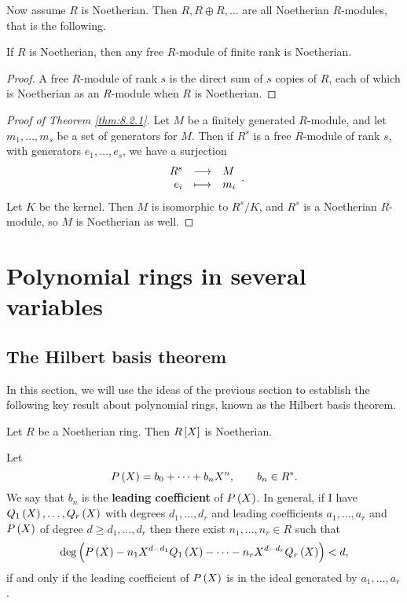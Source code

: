 Now assume $ R $ is Noetherian. Then $ R, R \oplus R, \dots $ are all Noetherian $ R $-modules, that is the following.

\begin{corollary}
If $ R $ is Noetherian, then any free $ R $-module of finite rank is Noetherian.
\end{corollary}

\begin{proof}
A free $ R $-module of rank $ s $ is the direct sum of $ s $ copies of $ R $, each of which is Noetherian as an $ R $-module when $ R $ is Noetherian.
\end{proof}

\begin{proof}[Proof of Theorem \ref{thm:8.2.1}]
Let $ M $ be a finitely generated $ R $-module, and let $ m_1, \dots, m_s $ be a set of generators for $ M $. Then if $ R^s $ is a free $ R $-module of rank $ s $, with generators $ e_1, \dots, e_s $, we have a surjection
$$ \function{R^s}{M}{e_i}{m_i}. $$
Let $ K $ be the kernel. Then $ M $ is isomorphic to $ R^s / K $, and $ R^s $ is a Noetherian $ R $-module, so $ M $ is Noetherian as well.
\end{proof}

\pagebreak

\section{Polynomial rings in several variables}

\subsection{The Hilbert basis theorem}

In this section, we will use the ideas of the previous section to establish the following key result about polynomial rings, known as the Hilbert basis theorem.

\begin{theorem}
\label{thm:9.1.1}
Let $ R $ be a Noetherian ring. Then $ R\sbr{X} $ is Noetherian.
\end{theorem}


Let
$$ P\br{X} = b_0 + \dots + b_nX^n, \qquad b_n \in R^*. $$
We say that $ b_n $ is the \textbf{leading coefficient} of $ P\br{X} $. In general, if I have $ Q_1\br{X}, \dots, Q_r\br{X} $ with degrees $ d_1, \dots, d_r $ and leading coefficients $ a_1, \dots, a_r $ and $ P\br{X} $ of degree $ d \ge d_1, \dots, d_r $ then there exist $ n_1, \dots, n_r \in R $ such that
$$ \deg\br{P\br{X} - n_1X^{d - d_1}Q_1\br{X} - \dots - n_rX^{d - d_r}Q_r\br{X}} < d, $$
if and only if the leading coefficient of $ P\br{X} $ is in the ideal generated by $ a_1, \dots, a_r $.

